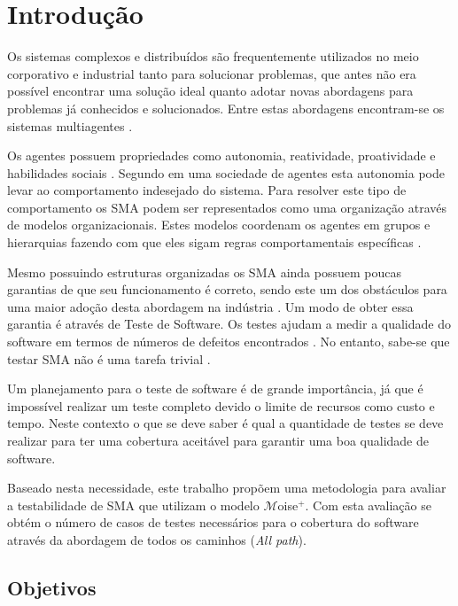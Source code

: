 \tableofcontents

\chapter{Introdução}
  
Os sistemas complexos e distribuídos são frequentemente utilizados no meio corporativo e industrial tanto para solucionar problemas, que antes não era possível encontrar uma solução ideal quanto adotar novas abordagens para problemas já conhecidos e solucionados. Entre estas abordagens encontram-se os sistemas multiagentes \cite{benfield2006making}.

Os agentes possuem propriedades como autonomia, reatividade, proatividade e habilidades sociais \cite{jennings2000agent}. Segundo \citet{hubner2007developing} em uma sociedade de agentes esta autonomia pode levar ao comportamento indesejado do sistema. Para resolver este tipo de comportamento os SMA podem ser representados como uma organização através de modelos organizacionais. Estes modelos coordenam os agentes em grupos e hierarquias fazendo com que eles sigam regras comportamentais específicas \cite{van2005formal, argente2006multi}.

Mesmo possuindo estruturas organizadas os SMA ainda possuem poucas garantias de que seu funcionamento é correto, sendo este um dos obstáculos para uma maior adoção desta abordagem na indústria \cite{houhamdi2011multi,winikoff2010assurance}. Um modo de obter essa garantia é através de Teste de Software. Os testes ajudam a medir a qualidade do software em termos de números de defeitos encontrados \cite{graham2008foundations}. No entanto, sabe-se que testar SMA não é uma tarefa trivial \cite{winikoff2010assurance}.

Um planejamento para o teste de software é de grande importância, já que é impossível realizar um teste completo devido o limite de recursos como custo e tempo. Neste contexto o que se deve saber é qual a quantidade de testes se deve realizar para ter uma cobertura aceitável para garantir uma boa qualidade de software.

Baseado nesta necessidade, este trabalho propõem uma metodologia para avaliar a testabilidade de SMA que utilizam o modelo $\mathcal{M}$oise$^{+}$. Com esta avaliação se obtém o número de casos de testes necessários para o cobertura do software através da abordagem de todos os caminhos (\textit{All path}).


\section{Objetivos}

